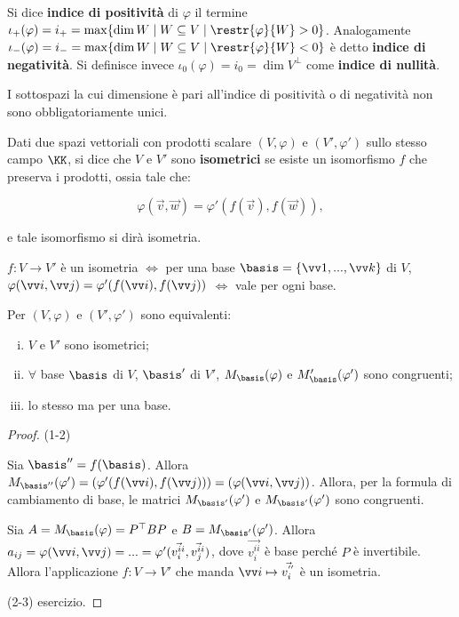 \documentclass[11pt]{article}
\begin{document}
	\begin{definition}
		Si dice \textbf{indice di positività} di $\varphi$ il
		termine $\iota_+(\varphi) = i_+ = \max \{ \dim W \mid W \subseteq V \mid \restr{\varphi}{W} > 0 \}$. Analogamente $\iota_-(\varphi) = i_- = \max \{ \dim W \mid W \subseteq V \mid \restr{\varphi}{W} < 0 \}$ è detto
		\textbf{indice di negatività}. Si definisce invece $\iota_0(\varphi) = i_0 = \dim V^\perp$ come \textbf{indice di nullità}.
	\end{definition}

	\begin{remark}\nl
		\li I sottospazi la cui dimensione è pari all'indice di positività
		o di negatività non sono obbligatoriamente unici.
	\end{remark}

	\begin{definition}
		Dati due spazi vettoriali con prodotti scalare $(V, \varphi)$ e
		$(V', \varphi')$ sullo stesso campo $\KK$, si dice che
		$V$ e $V'$ sono \textbf{isometrici} se esiste un isomorfismo
		$f$ che preserva i prodotti, ossia tale che:
		
		\[ \varphi(\vec v, \vec w) = \varphi'(f(\vec v), f(\vec w)), \]
		
		e tale isomorfismo si dirà isometria.
	\end{definition}

	\begin{exercise}\nl
		\li $f : V \to V'$ è un isometria $\iff$ per una base $\basis =
		\{\vv1, ..., \vv k\}$ di $V$, $\varphi(\vv i, \vv j) = \varphi'(f(\vv i), f(\vv j))$ $\iff$ vale per ogni base.
	\end{exercise}

	\begin{proposition}
		Per $(V, \varphi)$ e $(V', \varphi')$ sono equivalenti:
		
		\begin{enumerate}[(i)]
			\item $V$ e $V'$ sono isometrici;
			\item $\forall$ base $\basis$ di $V$, $\basis'$ di $V'$,
			$M_\basis(\varphi)$ e $M_\basis'(\varphi')$ sono congruenti;
			\item lo stesso ma per una base.
		\end{enumerate}
	\end{proposition}

	\begin{proof}
		(1-2)
		
		 \rightproof Sia $\basis'' = f(\basis)$. Allora $M_{\basis''}(\varphi')=
		 (\varphi'(f(\vv i), f(\vv j))) = (\varphi(\vv i, \vv j))$. Allora,
		 per la formula di cambiamento di base, le matrici
		 $M_{\basis'}(\varphi')$ e $M_{\basis'}(\varphi')$ sono congruenti.
		 
		 \leftproof Sia $A = M_\basis(\varphi) = P^\top B P$ e
		 $B = M_{\basis'}(\varphi')$. Allora $a_{ij} = \varphi(\vv i, \vv j) =
		 ... = \varphi'(\vec{v_i^{ii}}, \vec{v_j^{ii}})$, dove
		 $\vec{v_i^{ii}}$ è base perché $P$ è invertibile. Allora
		 l'applicazione $f : V \to V'$ che manda $\vv i \mapsto \vec{v_{i}^{''}}$ è un isometria.
		 
		 (2-3) esercizio.
	\end{proof}
\end{document}
